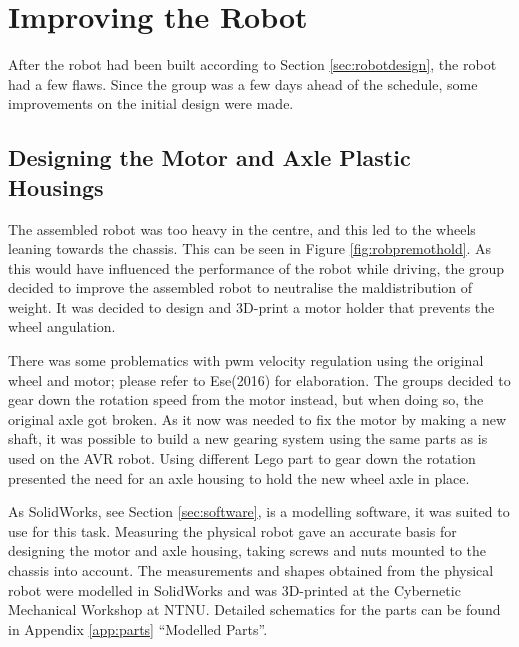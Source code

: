 \section{Improving the Robot}
\label{sec:improvements}
After the robot had been built according to Section \ref{sec:robotdesign}, the robot had a few flaws. Since the group was a few days ahead of the schedule, some improvements on the initial design were made.

\subsection{Designing the Motor and Axle Plastic Housings}
\label{sec:motoraxle}
The assembled robot was too heavy in the centre, and this led to the wheels leaning towards the chassis. This can be seen in Figure \ref{fig:robpremothold}.  As this would have influenced the performance of the robot while driving, the group decided to improve the assembled robot to neutralise the maldistribution of weight. It was decided to design and 3D-print a motor holder that prevents the wheel angulation.

There was some problematics with \acrshort{pwm} velocity regulation using the original wheel and motor; please refer to Ese(2016) for elaboration. The groups decided to gear down the rotation speed from the motor instead, but when doing so, the original axle got broken. As it now was needed to fix the motor by making a new shaft, it was possible to build a new gearing system using the same parts as is used on the AVR robot. Using different Lego part to gear down the rotation presented the need for an axle housing to hold the new wheel axle in place.

As SolidWorks, see Section \ref{sec:software}, is a modelling software, it was suited to use for this task. Measuring the physical robot gave an accurate basis for designing the motor and axle housing, taking screws and nuts mounted to the chassis into account. The measurements and shapes obtained from the physical robot were modelled in SolidWorks and was 3D-printed at the Cybernetic Mechanical Workshop at NTNU. Detailed schematics for the parts can be found in Appendix \ref{app:parts} ``Modelled Parts''. 


